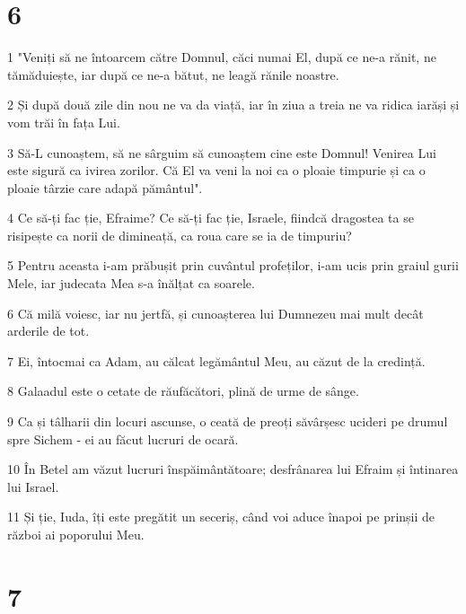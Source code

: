 \chapter{6}

\par 1 "Veniți să ne întoarcem către Domnul, căci numai El, după ce ne-a rănit, ne tămăduiește, iar după ce ne-a bătut, ne leagă rănile noastre.
\par 2 Și după două zile din nou ne va da viață, iar în ziua a treia ne va ridica iarăși și vom trăi în fața Lui.
\par 3 Să-L cunoaștem, să ne sârguim să cunoaștem cine este Domnul! Venirea Lui este sigură ca ivirea zorilor. Că El va veni la noi ca o ploaie timpurie și ca o ploaie târzie care adapă pământul".
\par 4 Ce să-ți fac ție, Efraime? Ce să-ți fac ție, Israele, fiindcă dragostea ta se risipește ca norii de dimineață, ca roua care se ia de timpuriu?
\par 5 Pentru aceasta i-am prăbușit prin cuvântul profeților, i-am ucis prin graiul gurii Mele, iar judecata Mea s-a înălțat ca soarele.
\par 6 Că milă voiesc, iar nu jertfă, și cunoașterea lui Dumnezeu mai mult decât arderile de tot.
\par 7 Ei, întocmai ca Adam, au călcat legământul Meu, au căzut de la credință.
\par 8 Galaadul este o cetate de răufăcători, plină de urme de sânge.
\par 9 Ca și tâlharii din locuri ascunse, o ceată de preoți săvârșesc ucideri pe drumul spre Sichem - ei au făcut lucruri de ocară.
\par 10 În Betel am văzut lucruri înspăimântătoare; desfrânarea lui Efraim și întinarea lui Israel.
\par 11 Și ție, Iuda, îți este pregătit un seceriș, când voi aduce înapoi pe prinșii de război ai poporului Meu.

\chapter{7}

